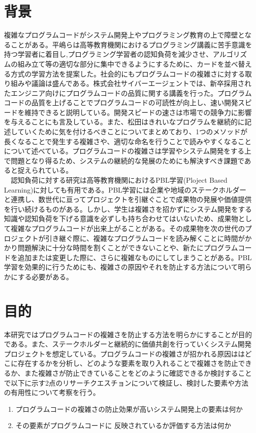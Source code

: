\documentclass[12pt, a4paper]{jreport}
\begin{document}
    \section{背景}
    複雑なプログラムコードがシステム開発上やプログラミング教育の上で障壁となることがある。平嶋ら\cite{haikei}は高等教育機関におけるプログラミング講義に苦手意識を持つ学習者に着目し,プログラミング学習者の認知負荷を減少させ、アルゴリズムの組み立て等の適切な部分に集中できるようにするために、カードを並べ替える方式の学習方法を提案した。社会的にもプログラムコードの複雑さに対する取り組みや議論は盛んである。株式会社サイバーエージェント\cite{CyberZ}では、新卒採用されたエンジニア向けにプログラムコードの品質に関する講義を行った。プログラムコードの品質を上げることでプログラムコードの可読性が向上し、速い開発スピードを維持できると説明している。開発スピードの速さは市場での競争力に影響を与えることにも言及している。また、松田\cite{kireina}はきれいなプログラムを継続的に記述していくために気を付けるべきことについてまとめており、1つのメソッドが長くなることで発生する複雑さや、適切な命名を行うことで読みやすくなることについて述べている。プログラムコードの複雑さは学習やシステム開発をする上で問題となり得るため、システムの継続的な発展のためにも解決すべき課題であると捉えられている。
    \\　認知負荷に対する研究は高等教育機関におけるPBL学習(Ploject Based Learning)に対しても有用である。PBL学習には企業や地域のステークホルダーと連携し、数世代に亘ってプロジェクトを引継ぐことで成果物の発展や価値提供を行い続けるものがある。しかし、学生は複雑さを招かずにシステム開発をする知識や認知負荷を下げる意識を必ずしも持ち合わせてはいないため、成果物として複雑なプログラムコードが出来上がることがある。その成果物を次の世代のプロジェクトが引き継ぐ際に、複雑なプログラムコードを読み解くことに時間がかかり問題解決に十分な時間を割くことができないことや、新たにプログラムコードを追加または変更した際に、さらに複雑なものにしてしまうことがある。PBL学習を効果的に行うためにも、複雑さの原因やそれを防止する方法について明らかにする必要がある。
\section{目的}
本研究ではプログラムコードの複雑さを防止する方法を明らかにすることが目的である。また、ステークホルダーと継続的に価値共創を行っていくシステム開発プロジェクトを想定している。プログラムコードの複雑さが招かれる原因ははどこに存在するかを分析し、どのような要素を取り入れることで複雑さを防止できるか、また複雑さが防止できていることをどのように確認できるか検討することで以下に示す2点のリサーチクエスチョンについて検証し、検討した要素や方法の有用性について考察を行う。
\begin{enumerate}
\item プログラムコードの複雑さの防止効果が高いシステム開発上の要素は何か
\item その要素がプログラムコードに
反映されているか評価する方法は何か
\end{enumerate}
\end{document}
